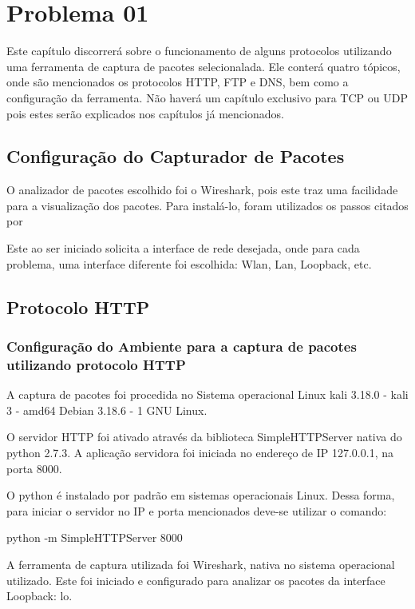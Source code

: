 \chapter[Problema 01]{Problema 01}

Este capítulo discorrerá sobre o funcionamento de alguns protocolos utilizando uma ferramenta
de captura de pacotes selecionalada. Ele conterá quatro tópicos, onde são mencionados os protocolos
HTTP, FTP e DNS, bem como a configuração da ferramenta. Não haverá um capítulo exclusivo para
TCP ou UDP pois estes serão explicados nos capítulos já mencionados.

\section{Configuração do Capturador de Pacotes}

O analizador de pacotes escolhido foi o Wireshark, pois este traz uma facilidade para a visualização
dos pacotes.
Para instalá-lo, foram utilizados os passos citados por \cite{instalacaowireshark}

Este ao ser iniciado solicita a interface de rede desejada, onde para cada problema, uma interface diferente
foi escolhida: Wlan, Lan, Loopback, etc.

\section{Protocolo HTTP}

\subsection{Configuração do Ambiente para a captura de pacotes utilizando protocolo HTTP}
A captura de pacotes foi procedida no Sistema operacional Linux kali 3.18.0 - kali 3 - amd64
Debian 3.18.6 - 1 GNU Linux.

O servidor HTTP foi ativado através da biblioteca SimpleHTTPServer nativa do python 2.7.3.
  A aplicação servidora foi iniciada no endereço de IP 127.0.0.1, na porta 8000.

O python é instalado por padrão em sistemas operacionais Linux. Dessa forma, para iniciar o
servidor no IP e porta mencionados deve-se utilizar o comando:

python -m SimpleHTTPServer 8000

A ferramenta de captura utilizada foi Wireshark, nativa no sistema operacional utilizado.
Este foi iniciado e configurado para analizar os pacotes da interface Loopback: lo.


